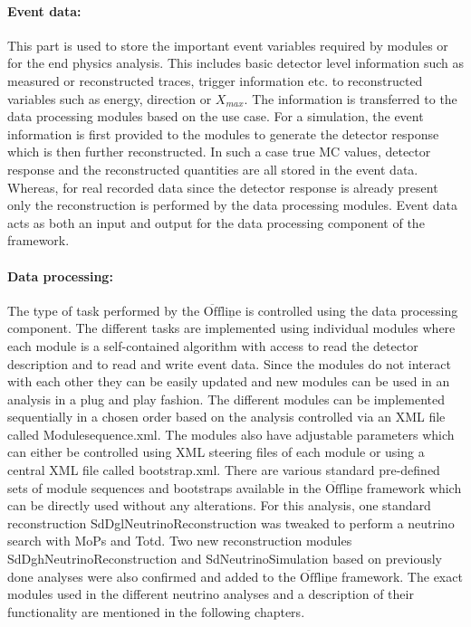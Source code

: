 \paragraph*{Event data:}
This part is used to store the important event variables required by modules or for the end physics analysis. This includes basic detector level information such as measured or reconstructed traces, trigger information etc. to reconstructed variables such as energy, direction or $X_{max}$. The information is transferred to the data processing modules based on the use case. For a simulation, the event information is first provided to the modules to generate the detector response which is then further reconstructed. In such a case true MC values, detector response and the reconstructed quantities are all stored in the event data. Whereas, for real recorded data since the detector response is already present only the reconstruction is performed by the data processing modules. Event data acts as both an input and output for the data processing component of the framework.

\paragraph*{Data processing:}
The type of task performed by the $\mathrm{\overline{Off}\underline{line}}$ is controlled using the data processing component. The different tasks are implemented using individual modules where each module is a self-contained algorithm with access to read the detector description and to read and write event data. Since the modules do not interact with each other they can be easily updated and new modules can be used in an analysis in a plug and play fashion. The different modules can be implemented sequentially in a chosen order based on the analysis controlled via an XML file called Modulesequence.xml. The modules also have adjustable parameters which can either be controlled using XML steering files of each module or using a central XML file called bootstrap.xml. There are various standard pre-defined sets of module sequences and bootstraps available in the $\mathrm{\overline{Off}\underline{line}}$ framework which can be directly used without any alterations. For this analysis, one standard reconstruction SdDglNeutrinoReconstruction was tweaked to perform a neutrino search with MoPs and Totd. Two new reconstruction modules SdDghNeutrinoReconstruction and SdNeutrinoSimulation based on previously done analyses were also confirmed and added to the $\mathrm{\overline{Off}\underline{line}}$ framework. The exact modules used in the different neutrino analyses and a description of their functionality are mentioned in the following chapters.

